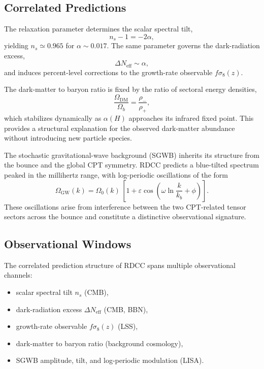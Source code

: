 \documentclass[11pt,a4paper]{article}
\begin{document}
\subsection{Correlated Predictions}

The relaxation parameter determines the scalar spectral tilt,
\begin{equation}
    n_{s} - 1 = -2\alpha,
\end{equation}
yielding $n_{s} \simeq 0.965$ for $\alpha \sim 0.017$. The same parameter governs
the dark-radiation excess,
\begin{equation}
    \Delta N_{\mathrm{eff}} \sim \alpha,
\end{equation}
and induces percent-level corrections to the growth-rate observable
$f\sigma_{8}(z)$.

The dark-matter to baryon ratio is fixed by the ratio of sectoral energy
densities,
\begin{equation}
    \frac{\Omega_{\mathrm{DM}}}{\Omega_{b}}
        = \frac{\rho_{-}}{\rho_{+}},
\end{equation}
which stabilizes dynamically as $\alpha(H)$ approaches its infrared fixed point.
This provides a structural explanation for the observed dark-matter abundance
without introducing new particle species.

The stochastic gravitational-wave background (SGWB) inherits its structure from
the bounce and the global CPT symmetry. RDCC predicts a blue-tilted spectrum
peaked in the millihertz range, with log-periodic oscillations of the form
\begin{equation}
    \Omega_{\mathrm{GW}}(k)
        = \Omega_{0}(k)\,
          \left[
              1
              + \varepsilon
                \cos\!\left(
                    \omega \ln\frac{k}{k_{b}}
                    + \phi
                \right)
          \right].
\end{equation}
These oscillations arise from interference between the two CPT-related tensor
sectors across the bounce and constitute a distinctive observational signature.

\subsection{Observational Windows}

The correlated prediction structure of RDCC spans multiple observational
channels:

\begin{itemize}
    \item scalar spectral tilt $n_{s}$ (CMB),
    \item dark-radiation excess $\Delta N_{\mathrm{eff}}$ (CMB, BBN),
    \item growth-rate observable $f\sigma_{8}(z)$ (LSS),
    \item dark-matter to baryon ratio (background cosmology),
    \item SGWB amplitude, tilt, and log-periodic modulation (LISA).
\end{itemize}
\end{document}
